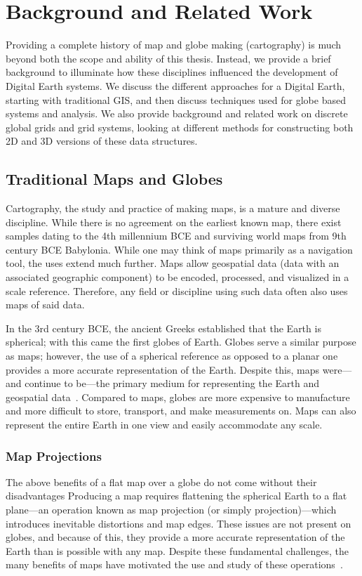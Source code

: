 \chapter{Background and Related Work} \label{chap:background}
Providing a complete history of map and globe making (cartography) is much beyond both the scope and ability of this thesis.
Instead, we provide a brief background to illuminate how these disciplines influenced the development of Digital Earth systems.
We discuss the different approaches for a Digital Earth, starting with traditional GIS, and then discuss techniques used for globe based systems and analysis.
We also provide background and related work on discrete global grids and grid systems, looking at different methods for constructing both 2D and 3D versions of these data structures.


\section{Traditional Maps and Globes}
Cartography, the study and practice of making maps, is a mature and diverse discipline.
While there is no agreement on the earliest known map, there exist samples dating to the 4th millennium BCE and surviving world maps from 9th century BCE Babylonia.
While one may think of maps primarily as a navigation tool, the uses extend much further.
Maps allow geospatial data (data with an associated geographic component) to be encoded, processed, and visualized in a scale reference.
Therefore, any field or discipline using such data often also uses maps of said data.


In the 3rd century BCE, the ancient Greeks established that the Earth is spherical; with this came the first globes of Earth.
Globes serve a similar purpose as maps; however, the use of a spherical reference as opposed to a planar one provides a more accurate representation of the Earth.
Despite this, maps were---and continue to be---the primary medium for representing the Earth and geospatial data~\cite{hruby20182000}.
Compared to maps, globes are more expensive to manufacture and more difficult to store, transport, and make measurements on.
Maps can also represent the entire Earth in one view and easily accommodate any scale.


\subsection{Map Projections}
The above benefits of a flat map over a globe do not come without their disadvantages
Producing a map requires flattening the spherical Earth to a flat plane---an operation known as map projection (or simply projection)---which introduces inevitable distortions and map edges.
These issues are not present on globes, and because of this, they provide a more accurate representation of the Earth than is possible with any map.
Despite these fundamental challenges, the many benefits of maps have motivated the use and study of these operations~\cite{snyder1987map, snyder1997flattening}.


